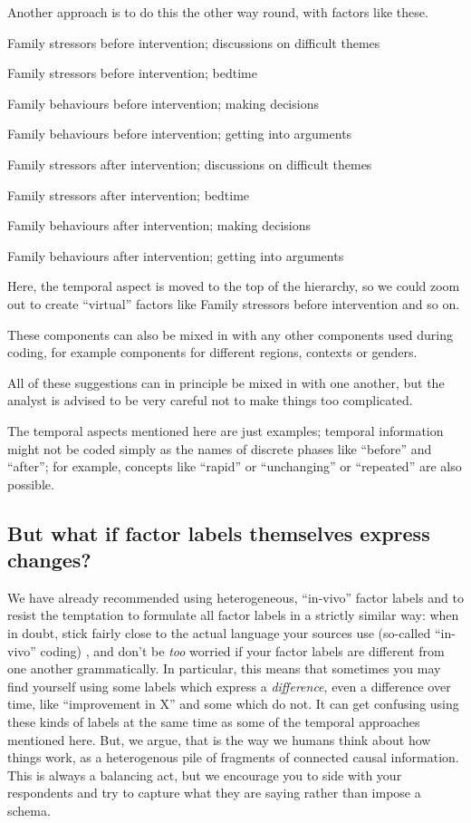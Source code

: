 \documentclass[
]{book}
\begin{document}
Another approach is to do this the other way round, with factors like these.

Family stressors before intervention; discussions on difficult themes

Family stressors before intervention; bedtime

Family behaviours before intervention; making decisions

Family behaviours before intervention; getting into arguments

Family stressors after intervention; discussions on difficult themes

Family stressors after intervention; bedtime

Family behaviours after intervention; making decisions

Family behaviours after intervention; getting into arguments

Here, the temporal aspect is moved to the top of the hierarchy, so we could zoom out to create ``virtual'' factors like Family stressors before intervention and so on.

These components can also be mixed in with any other components used during coding, for example components for different regions, contexts or genders.

All of these suggestions can in principle be mixed in with one another, but the analyst is advised to be very careful not to make things too complicated.

The temporal aspects mentioned here are just examples; temporal information might not be coded simply as the names of discrete phases like ``before'' and ``after''; for example, concepts like ``rapid'' or ``unchanging'' or ``repeated'' are also possible.

\hypertarget{but-what-if-factor-labels-themselves-express-changes}{%
\subsection{But what if factor labels themselves express changes?}\label{but-what-if-factor-labels-themselves-express-changes}}

We have already recommended using heterogeneous, ``in-vivo'' factor labels and to resist the temptation to formulate all factor labels in a strictly similar way: when in doubt, stick fairly close to the actual language your sources use (so-called ``in-vivo'' coding) , and don't be \emph{too} worried if your factor labels are different from one another grammatically. In particular, this means that sometimes you may find yourself using some labels which express a \emph{difference}, even a difference over time, like ``improvement in X'' and some which do not. It can get confusing using these kinds of labels at the same time as some of the temporal approaches mentioned here. But, we argue, that is the way we humans think about how things work, as a heterogenous pile of fragments of connected causal information. This is always a balancing act, but we encourage you to side with your respondents and try to capture what they are saying rather than impose a schema.
\end{document}
